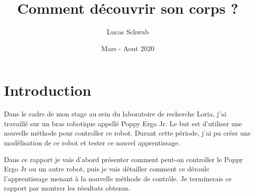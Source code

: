 \documentclass[11pt,french]{report}
\title{Comment découvrir son corps ?}
\author{Lucas Schwab}
\date{Mars - Aout 2020}
\begin{document}
\maketitle








\chapter{Introduction}

Dans le cadre de mon stage au sein du laboratoire de recherche Loria, j'ai travaillé sur un bras robotique appellé Poppy Ergo Jr.
Le but est d'utiliser une nouvelle méthode pour controller ce robot.
Durant cette période, j'ai pu créer une modélisation de ce robot et tester ce nouvel apprentissage. 

Dans ce rapport je vais d'abord présenter comment peut-on controller le Poppy Ergo Jr ou un autre robot, puis je vais détailler comment ce déroule l'apprentissage menant à la nouvelle méthode de contrôle.
Je terminerais ce rapport par montrer les résultats obtenus.
\end{document}
